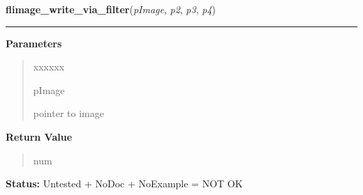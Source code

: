 \hspace{.8\funcindent}\begin{boxedminipage}{\funcwidth}

    \raggedright \textbf{flimage\_write\_via\_filter}(\textit{pImage}, \textit{p2}, \textit{p3}, \textit{p4})

    \vspace{-1.5ex}

    \rule{\textwidth}{0.5\fboxrule}
\setlength{\parskip}{2ex}
\setlength{\parskip}{1ex}
      \textbf{Parameters}
      \vspace{-1ex}

      \begin{quote}
        \begin{Ventry}{xxxxxx}

          \item[pImage]

          pointer to image

        \end{Ventry}

      \end{quote}

      \textbf{Return Value}
    \vspace{-1ex}

      \begin{quote}
      num

      \end{quote}

\textbf{Status:} Untested + NoDoc + NoExample = NOT OK



    \end{boxedminipage}

    \label{xformslib:library:flimage_free}

    \vspace{0.5ex}

